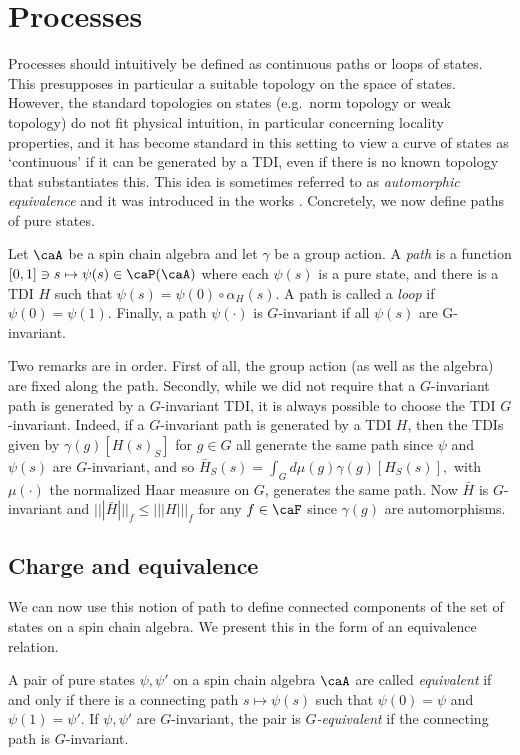 \section{Processes}\label{sec: processes}

Processes should intuitively be defined as continuous paths or loops of states.  This  presupposes in particular a suitable topology on the space of states. However, the standard topologies on states (e.g.\ norm topology or weak topology) do not fit physical intuition, in particular concerning locality properties, and it has become standard in this setting to view a curve of states as `continuous' if it can be generated by a TDI, even if there is no known topology that substantiates this.  This idea is sometimes referred to as \emph{automorphic equivalence} and it was introduced in the works \cite{hastings2005quasiadiabatic,bachmann2012automorphic}.  Concretely, we now define paths of pure states.
\begin{definition}[Paths] \label{def: paths}
	Let $\caA$ be a spin chain algebra and let $\gamma$ be a group action. A \emph{path} is a function $[0,1] \ni s \mapsto \psi(s)\in\caP(\caA)$ where each $\psi(s)$ is a pure state, and there is a TDI $H$ such that $\psi(s)=\psi(0)\circ\alpha_H(s)$. A path is called a \emph{loop} if $\psi(0) = \psi(1)$.
	Finally, a path $\psi(\cdot)$ is $G$-invariant if all $\psi(s)$ are G-invariant. 
\end{definition}
Two remarks are in order. First of all, the group action (as well as the algebra) are fixed along the path. Secondly, while we did not require that a $G$-invariant path is generated by a $G$-invariant TDI, it is always possible to choose the TDI $G$-invariant. Indeed, if a $G$-invariant path is generated by a TDI $H$, then the TDIs given by $\gamma(g)[H(s)_S]$ for $g\in G$ all generate the same path since $\psi$ and $\psi(s)$ are $G$-invariant, and so
$
\bar{H}_S(s)=   \int_G d\mu(g)  \gamma(g)[H_S(s)],
$
with $\mu(\cdot)$ the normalized Haar measure on $G$, generates the same path. Now $\bar{H}$ is $G$-invariant and $|||\bar H |||_f \leq |||H|||_f$ for any $f\in \caF$ since $\gamma(g)$ are automorphisms.


\subsection{Charge and equivalence}\label{sec: equivalence}

We can now use this notion of path to define connected components of the set of states on a spin chain algebra. We present this in the form of an equivalence relation.
\begin{definition}[Equivalence]
	A pair of pure states $\psi,\psi'$  on a spin chain algebra $\caA$ are called \emph{equivalent} if and only if there is a connecting  path $s\mapsto \psi(s)$ such that $\psi(0)=\psi$ and $\psi(1)=\psi'$. If $\psi,\psi'$ are $G$-invariant, the pair is \emph{$G$-equivalent} if the connecting path is $G$-invariant. 
\end{definition}

